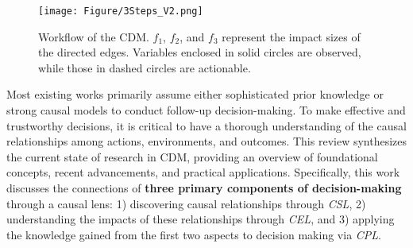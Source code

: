  



\begin{figure}[!t]
    \centering
    \texttt{[image: Figure/3Steps\_V2.png]}
    \caption{Workflow of the \acrlong{CDM}. $f_1$, $f_2$, and $f_3$ represent the impact sizes of the directed edges. Variables enclosed in solid circles are observed, while those in dashed circles are actionable.}\label{fig:cdm}
\end{figure}


Most existing works primarily assume either sophisticated prior knowledge or strong causal models to conduct follow-up decision-making. To make effective and trustworthy decisions, it is critical to have a thorough understanding of the causal relationships among actions, environments, and outcomes. This review synthesizes the current state of research in \acrfull{CDM}, providing an overview of foundational concepts, recent advancements, and practical applications. Specifically, this work discusses the connections of \textbf{three primary components of decision-making} through a causal lens: 1) discovering causal relationships through \textit{\acrfull{CSL}}, 2) understanding the impacts of these relationships through \textit{\acrfull{CEL}}, and 3) applying the knowledge gained from the first two aspects to decision making via \textit{\acrfull{CPL}}. 

